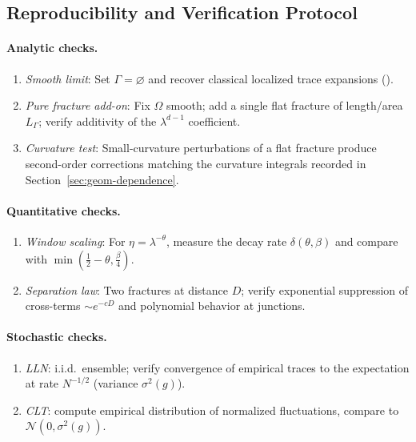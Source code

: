 \subsection{Reproducibility and Verification Protocol}
\label{subsec:05-verification}
\paragraph{Analytic checks.}
\begin{enumerate}[label=(A\arabic*)]
  \item \emph{Smooth limit}: Set $\Gamma=\varnothing$ and recover classical
  localized trace expansions (\cite{SafarovVassiliev1996}).
  \item \emph{Pure fracture add-on}: Fix $\Omega$ smooth; add a single flat
  fracture of length/area $L_\Gamma$; verify additivity of the $\lambda^{d-1}$
  coefficient.
  \item \emph{Curvature test}: Small-curvature perturbations of a flat fracture
  produce second-order corrections matching the curvature integrals recorded
  in Section~\ref{sec:geom-dependence}.
\end{enumerate}
\paragraph{Quantitative checks.}
\begin{enumerate}[label=(Q\arabic*)]
  \item \emph{Window scaling}: For $\eta=\lambda^{-\theta}$, measure the decay rate
  $\delta(\theta,\beta)$ and compare with $\min(\tfrac12-\theta,\tfrac{\beta}{4})$.
  \item \emph{Separation law}: Two fractures at distance $D$; verify exponential
  suppression of cross-terms $\sim e^{-cD}$ and polynomial behavior at junctions.
\end{enumerate}
\paragraph{Stochastic checks.}
\begin{enumerate}[label=(S\arabic*)]
  \item \emph{LLN}: i.i.d.\ ensemble; verify convergence of empirical traces to
  the expectation at rate $N^{-1/2}$ (variance $\sigma^2(g)$).
  \item \emph{CLT}: compute empirical distribution of normalized fluctuations,
  compare to $\mathcal{N}(0,\sigma^2(g))$.
\end{enumerate}

